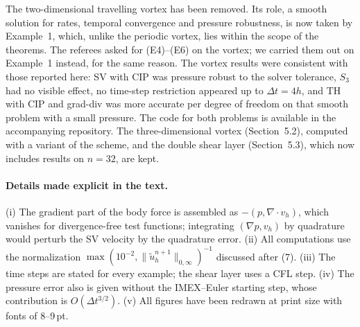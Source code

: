 The two-dimensional travelling vortex has been removed. Its role, a smooth solution for rates,
temporal convergence and pressure robustness, is now taken by Example~1, which, unlike the
periodic vortex, lies within the scope of the theorems. The referees asked for (E4)--(E6) on the
vortex; we carried them out on Example~1 instead, for the same reason. The vortex results were
consistent with those reported here: SV with CIP was pressure robust to the solver tolerance,
$S_3$ had no visible effect, no time-step restriction appeared up to $\Delta t=4h$, and TH with CIP
and grad-div was more accurate per degree of freedom on that smooth problem with a small pressure.
The code for both problems is available in the accompanying repository. The three-dimensional
vortex (Section~5.2), computed with a variant of the scheme, and the double shear layer
(Section~5.3), which now includes results on $n=32$, are kept.

\paragraph{Details made explicit in the text.}
(i) The gradient part of the body force is assembled as $-(p,\nabla\cdot v_h)$, which vanishes
for divergence-free test functions; integrating $(\nabla p,v_h)$ by quadrature would perturb the
SV velocity by the quadrature error. (ii) All computations use the normalization
$\max(10^{-2},\|\tilde u_h^{n+1}\|_{0,\infty})^{-1}$ discussed after (7). (iii) The time steps are stated
for every example; the shear layer uses a CFL step. (iv) The pressure error also is given without
the IMEX--Euler starting step, whose contribution is $O(\Delta t^{3/2})$. (v) All figures have been
redrawn at print size with fonts of 8--9\,pt.
